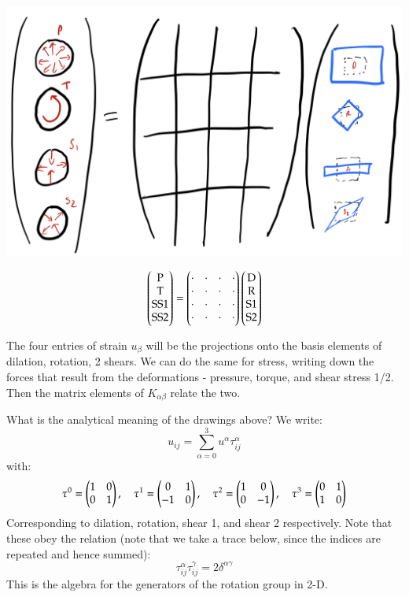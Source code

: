 \begin{center}
    \includegraphics[scale=0.35]{Lectures/Images/lec2-stiffnessmatrix.png}
\end{center}
\begin{equation}
    \begin{pmatrix}\text{P} \\ \text{T} \\ \text{SS1} \\ \text{SS2}\end{pmatrix} = \begin{pmatrix}\cdot & \cdot & \cdot & \cdot \\ \cdot & \cdot & \cdot & \cdot \\ \cdot & \cdot & \cdot & \cdot \\ \cdot & \cdot & \cdot & \cdot\end{pmatrix}\begin{pmatrix}\text{D} \\ \text{R} \\ \text{S1} \\ \text{S2}\end{pmatrix}
\end{equation}

The four entries of strain $u_{\beta}$ will be the projections onto the basis elements of dilation, rotation, 2 shears. We can do the same for stress, writing down the forces that result from the deformations - pressure, torque, and shear stress 1/2. Then the matrix elements of $K_{\alpha\beta}$ relate the two.

What is the analytical meaning of the drawings above? We write:
\begin{equation}
    u_{ij} = \sum_{\alpha=0}^3 u^\alpha \tau_{ij}^\alpha
\end{equation}
with:
\begin{equation}
    \tau^0 = \begin{pmatrix}1 & 0 \\ 0 & 1\end{pmatrix}, \quad \tau^1 = \begin{pmatrix}0 & 1 \\ -1 & 0\end{pmatrix}, \quad \tau^2 = \begin{pmatrix}1 & 0 \\ 0 & -1\end{pmatrix}, \quad \tau^3 = \begin{pmatrix}0 & 1 \\ 1 & 0\end{pmatrix}
\end{equation}
Corresponding to dilation, rotation, shear 1, and shear 2 respectively. Note that these obey the relation (note that we take a trace below, since the indices are repeated and hence summed):
\begin{equation}
    \boxed{\tau_{ij}^\alpha \tau_{ij}^\gamma = 2\delta^{\alpha\gamma}}
\end{equation}
This is the algebra for the generators of the rotation group in 2-D.

